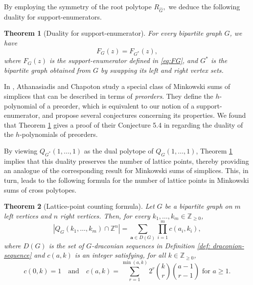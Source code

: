 \documentclass[11pt,a4paper]{article}
\newcommand{\vct}[1]{\boldsymbol{#1}}
\newcommand{\Z}{\mathbb{Z}}
\newcommand{\1}{\mathbf{1}}
\theoremstyle{plain}
\newtheorem{theorem}{Theorem}[section]
\theoremstyle{definition}
\begin{document}
By employing the symmetry of the root polytope $R_{\widehat G},$ we deduce the following duality for support-enumerators.

\begin{theorem}[Duality for support-enumerator]\label{thm:duality-support-enumerator}
For every bipartite graph $G$, we have
\begin{equation}
F_G(z)=F_{G^*}(z),
\label{eq:duality}
\end{equation}
where $F_{G}(z)$ is the support-enumerator defined in \eqref{eq:FG}, and $G^*$ is the bipartite graph obtained from $G$ by swapping its left and right vertex sets. 
\end{theorem}

In \cite{chapoton2026}, Athanasiadis and Chapoton study a special class of Minkowski sums of simplices that can be described in terms of \emph{preorders}. They define the $h$-polynomial of a preorder, which is equivalent to our notion of a support-enumerator, and propose several conjectures concerning its properties. We found that Theorem \ref{thm:duality-support-enumerator} 
gives a proof of their Conjecture 5.4 in \cite{chapoton2026} regarding the duality of the $h$-polynomials of preorders. 


By viewing $Q_{G^*}(1,\dots, 1)$ as the dual polytope of $Q_G(1,\dots, 1)$, Theorem \ref{thm:duality-support-enumerator} implies that this duality preserves the number of lattice points, thereby providing an analogue of the corresponding result for Minkowski sums of simplices. This, in turn, leads to the following formula for the number of lattice points in Minkowski sums of cross polytopes.

\begin{theorem}[Lattice-point counting formula]\label{thm:general-formula-for-lattice-points}
Let $G$ be a bipartite graph on $m$ left vertices and $n$ right vertices. Then, for every $k_1,\ldots,k_m\in\Z_{\ge0}$,
\begin{equation}
|Q_G(k_1,\ldots,k_m)\cap\Z^n|
=\sum_{\vct{a}\in D(G)}\prod_{i=1}^m c(a_i,k_i),
\label{eq:general-count}
\end{equation}
where $D(G)$ is the set of $G$-draconian sequences in Definition \ref{def: draconion-sequence} and $c(a,k)$ is an integer satisfying, for all $k \in \Z_{\geq 0}$,
\begin{equation*}
c(0,k) = 1 \quad \text{and} \quad c(a,k)=\sum_{r=1}^{\min(a,k)}2^r\binom{k}{r}\binom{a-1}{r-1} \text{ for } a\geq 1.
\end{equation*}
\end{theorem}
\end{document}
